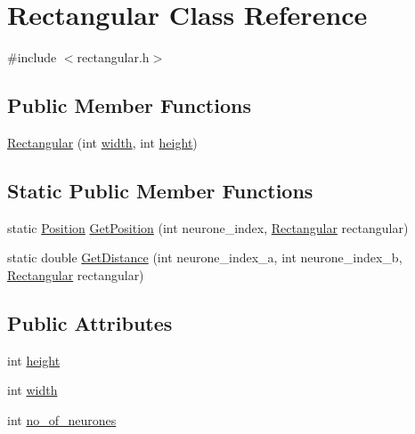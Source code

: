 \hypertarget{class_rectangular}{}\section{Rectangular Class Reference}
\label{class_rectangular}


{\ttfamily \#include $<$rectangular.\+h$>$}

\subsection*{Public Member Functions}
\begin{DoxyCompactItemize}
\item 
\mbox{\hyperlink{class_rectangular_a8fc2d25fc29143c6564448007c4725cf}{Rectangular}} (int \mbox{\hyperlink{class_rectangular_a6a74241795eda772d1f9df3eba21d958}{width}}, int \mbox{\hyperlink{class_rectangular_a1b36633774b826417ee0577bf2e842bc}{height}})
\end{DoxyCompactItemize}
\subsection*{Static Public Member Functions}
\begin{DoxyCompactItemize}
\item 
static \mbox{\hyperlink{struct_position}{Position}} \mbox{\hyperlink{class_rectangular_a90a2046a1b132e35221b032a1450838e}{Get\+Position}} (int neurone\+\_\+index, \mbox{\hyperlink{class_rectangular}{Rectangular}} rectangular)
\item 
static double \mbox{\hyperlink{class_rectangular_a215357402c86908fffa815a8f164849e}{Get\+Distance}} (int neurone\+\_\+index\+\_\+a, int neurone\+\_\+index\+\_\+b, \mbox{\hyperlink{class_rectangular}{Rectangular}} rectangular)
\end{DoxyCompactItemize}
\subsection*{Public Attributes}
\begin{DoxyCompactItemize}
\item 
int \mbox{\hyperlink{class_rectangular_a1b36633774b826417ee0577bf2e842bc}{height}}
\item 
int \mbox{\hyperlink{class_rectangular_a6a74241795eda772d1f9df3eba21d958}{width}}
\item 
int \mbox{\hyperlink{class_rectangular_af5dd2b7923db8c1801c53a39baf4a278}{no\+\_\+of\+\_\+neurones}}
\end{DoxyCompactItemize}


